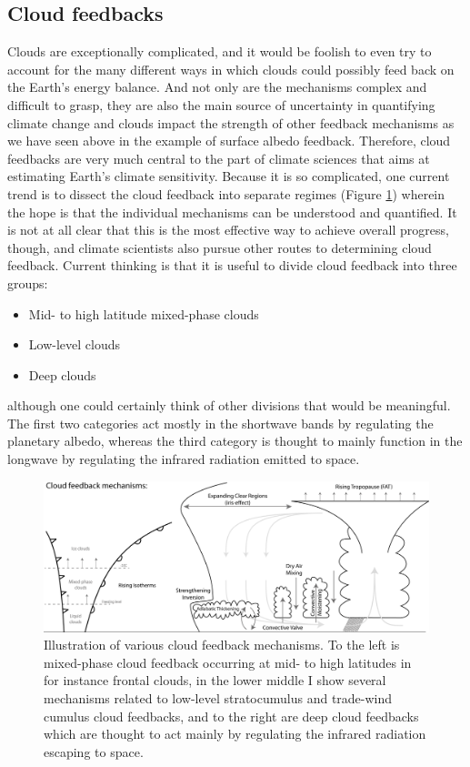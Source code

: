 \documentclass[12pt]{book}
\begin{document}
\subsection{Cloud feedbacks}
\label{sec:cloud_feedback}
Clouds are exceptionally complicated, and it would be foolish to even try to account for the many different ways in which clouds could possibly feed back on the Earth's energy balance. And not only are the mechanisms complex and difficult to grasp, they are also the main source of uncertainty in quantifying climate change and clouds impact the strength of other feedback mechanisms as we have seen above in the example of surface albedo feedback. Therefore, cloud feedbacks are very much central to the part of climate sciences that aims at estimating Earth's climate sensitivity. Because it is so complicated, one current trend is to dissect the cloud feedback into separate regimes (Figure \ref{fig:cloud_feedback_illustration}) wherein the hope is that the individual mechanisms can be understood and quantified. It is not at all clear that this is the most effective way to achieve overall progress, though, and climate scientists also pursue other routes to determining cloud feedback. 
Current thinking is that it is useful to divide cloud feedback into three groups:
\begin{itemize}
\item Mid- to high latitude mixed-phase clouds
\item Low-level clouds 
\item Deep clouds
\end{itemize}
although one could certainly think of other divisions that would be meaningful. The first two categories act mostly in the shortwave bands by regulating the planetary albedo, whereas the third category is thought to mainly function in the longwave by regulating the infrared radiation emitted to space.

\begin{figure}
\begin{center}
\includegraphics[width=17 cm]{../illustrations/Cloud_feedbacks_illustration.png}
\end{center}
\caption{ Illustration of various cloud feedback mechanisms. To the left is mixed-phase cloud feedback occurring at mid- to high latitudes in for instance frontal clouds, in the lower middle I show several mechanisms related to low-level stratocumulus and trade-wind cumulus cloud feedbacks, and to the right are deep cloud feedbacks which are thought to act mainly by regulating the infrared radiation escaping to space. } 
\label{fig:cloud_feedback_illustration}
\end{figure}
\end{document}
